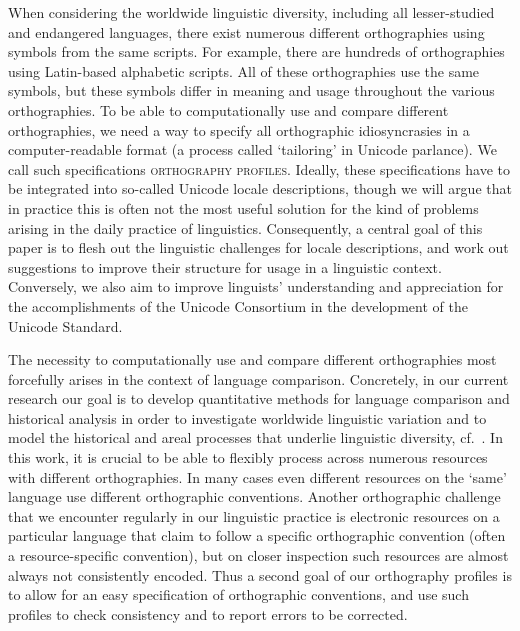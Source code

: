 When considering the worldwide linguistic diversity, including all lesser-studied and endangered languages, there exist numerous different orthographies using symbols from the same scripts. For example, there are hundreds of orthographies using Latin-based alphabetic scripts. All of these orthographies use the same symbols, but these symbols differ in meaning and usage throughout the various orthographies. To be able to computationally use and compare different orthographies, we need a way to specify all orthographic idiosyncrasies in a computer-readable format (a process called `tailoring' in Unicode parlance). We call such specifications \textsc{orthography profiles}. Ideally, these specifications have to be integrated into so-called Unicode locale descriptions, though we will argue that in practice this is often not the most useful solution for the kind of problems arising in the daily practice of linguistics. Consequently, a central goal of this paper is to flesh out the linguistic challenges for locale descriptions, and work out suggestions to improve their structure for usage in a linguistic context. Conversely, we also aim to improve linguists' understanding and appreciation for the accomplishments of the Unicode Consortium in the development of the Unicode Standard.

The necessity to computationally use and compare different orthographies most forcefully arises in the context of language comparison. Concretely, in our current research our goal is to develop quantitative methods for language comparison and historical analysis in order to investigate worldwide linguistic variation and to model the historical and areal processes that underlie linguistic diversity, cf.~\citet{Steiner_etal2011,List2012,List2012a,ListMoran2013,MoranProkic2013}. In this work, it is crucial to be able to flexibly process across numerous resources with different orthographies. In many cases even different resources on the `same' language use different orthographic conventions. Another orthographic challenge that we encounter regularly in our linguistic practice is electronic resources on a particular language that claim to follow a specific orthographic convention (often a resource-specific convention), but on closer inspection such resources are almost always not consistently encoded. Thus a second goal of our orthography profiles is to allow for an easy specification of orthographic conventions, and use such profiles to check consistency and to report errors to be corrected.

